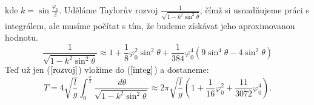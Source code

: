 kde $k=\sin\frac{\varphi_0}{2}$.
Uděláme Taylorův rozvoj $\frac{1}{\sqrt{1-k^2\sin^2\theta}}$, čímž si usnadňujeme práci s integrálem, ale musíme počítat s tím, že budeme získávat jeho aproximovanou hodnotu.
\begin{equation}
\label{rozvoj}
\frac{1}{\sqrt{1-k^2\sin^2\theta}}\approx1+\frac{1}{8} \varphi_0 ^2 \sin ^2\theta+\frac{1}{384} \varphi_0 ^4 \left(9 \sin ^4\theta-4 \sin
   ^2\theta \right)
\end{equation}
Teď už jen ($\ref{rozvoj}$) vložíme do ($\ref{integ}$) a dostaneme:
\begin{equation}
T=4\sqrt{\frac{l}{g}}\int_{0}^{\frac{\pi}{2}}\frac{\,d\theta}{\sqrt{1-k^2\sin^2\theta}}\approx2\pi\sqrt{\frac{l}{g}}\left(1+\frac{1}{16}\varphi_0^2+\frac{11}{3072}\varphi_0^4\right).
\end{equation}

